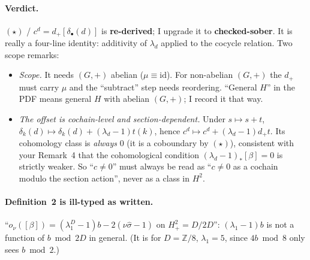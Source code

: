 \documentclass[11pt]{article}
\newcommand{\Z}{\mathbb{Z}}
\newcommand{\sh}{\hat\sigma}
\newcommand{\dplus}{d_{+}}
\begin{document}
\paragraph{Verdict.} $(\star)$ / $c^d=\dplus[\delta_\bullet(d)]$ is \textbf{re-derived};
I upgrade it to \textbf{checked-sober}. It is really a four-line identity: additivity
of $\lambda_d$ applied to the cocycle relation. Two scope remarks:
\begin{itemize}[leftmargin=*]
\item \emph{Scope.} It needs $(G,+)$ abelian ($\mu\equiv\mathrm{id}$). For non-abelian
$(G,+)$ the $\dplus$ must carry $\mu$ and the ``subtract'' step needs reordering.
``General $H$'' in the PDF means general $H$ with abelian $(G,+)$; I record it that way.
\item \emph{The offset is cochain-level and section-dependent.} Under $s\mapsto s+t$,
$\delta_k(d)\mapsto\delta_k(d)+(\lambda_d-1)t(k)$, hence
$c^d\mapsto c^d+(\lambda_d-1)\dplus t$. Its cohomology class is \emph{always} $0$ (it is a
coboundary by $(\star)$), consistent with your Remark~4 that the cohomological
condition $(\lambda_d-1)_*[\beta]=0$ is strictly weaker. So ``$c\neq0$'' must always be
read as ``$c\neq0$ as a cochain modulo the section action'', never as a class in $H^2$.
\end{itemize}

\paragraph{Definition~2 is ill-typed as written.} ``$o_\nu([\beta])=(\lambda^D_1-1)b-2(\nu\sh-1)$
on $H^2_+=D/2D$'': $(\lambda_1-1)b$ is not a function of $b\bmod 2D$ in general. (It
is for $D=\Z/8$, $\lambda_1=5$, since $4b\bmod 8$ only sees $b\bmod 2$.)
\end{document}
